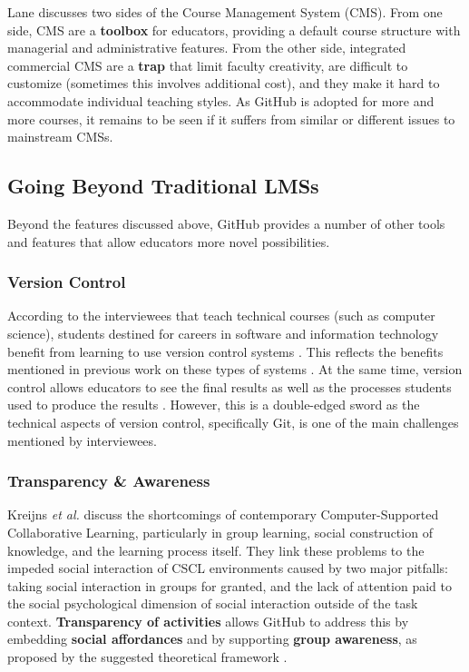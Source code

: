 Lane \cite{lane2008toolbox} discusses two sides of the Course Management System (CMS). From one side, CMS are a \textbf{toolbox} for educators, providing a default course structure with managerial and administrative features. From the other side, integrated commercial CMS are a \textbf{trap} that limit faculty creativity, are difficult to customize (sometimes this involves additional cost), and they make it hard to accommodate individual teaching styles. As GitHub is adopted for more and more courses, it remains to be seen if it suffers from similar or different issues to mainstream CMSs.

\subsection{Going Beyond Traditional LMSs}
Beyond the features discussed above, GitHub provides a number of other tools and features that allow educators more novel possibilities.

\subsubsection{Version Control}
According to the interviewees that teach technical courses (such as computer science), students destined for careers in software and information technology benefit from learning to use version control systems \cite{britton2013using}. This reflects the benefits mentioned in previous work on these types of systems \cite{reid2005learning}. At the same time, version control allows educators to see the final results as well as the processes students used to produce the results \cite{glassy2006using}. However, this is a double-edged sword as the technical aspects of version control, specifically Git, is one of the main challenges mentioned by interviewees.

\subsubsection{Transparency \& Awareness}
Kreijns \textit{et al.} \cite{kreijns2013social} discuss the shortcomings of contemporary Computer-Supported Collaborative Learning, particularly in group learning, social construction of knowledge, and the learning process itself. They link these problems to the impeded social interaction of CSCL environments caused by two major pitfalls: taking social interaction in groups for granted, and the lack of attention paid to the social psychological dimension of social interaction outside of the task context. \textbf{Transparency of activities} allows GitHub to address this by embedding \textbf{social affordances} and by supporting \textbf{group awareness}, as proposed by the suggested theoretical framework \cite{kreijns2002sociability}.

